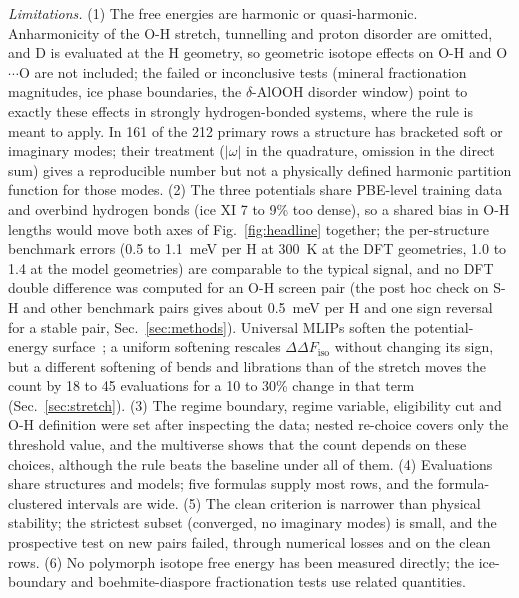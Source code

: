 \documentclass[aps,prmaterials,reprint,superscriptaddress,nofootinbib]{revtex4-2}
\newcommand{\ddF}{\Delta\Delta F_{\mathrm{iso}}}
\begin{document}
\textit{Limitations.} (1) The free energies are harmonic or quasi-harmonic. Anharmonicity of the O-H stretch, tunnelling and proton disorder are omitted, and D is evaluated at the H geometry, so geometric isotope effects on O-H and O$\cdots$O are not included; the failed or inconclusive tests (mineral fractionation magnitudes, ice phase boundaries, the $\delta$-AlOOH disorder window) point to exactly these effects in strongly hydrogen-bonded systems, where the rule is meant to apply. In 161 of the 212 primary rows a structure has bracketed soft or imaginary modes; their treatment ($|\omega|$ in the quadrature, omission in the direct sum) gives a reproducible number but not a physically defined harmonic partition function for those modes. (2) The three potentials share PBE-level training data and overbind hydrogen bonds (ice XI 7 to 9\% too dense), so a shared bias in O-H lengths would move both axes of Fig.~\ref{fig:headline} together; the per-structure benchmark errors (0.5 to 1.1~meV per H at 300~K at the DFT geometries, 1.0 to 1.4 at the model geometries) are comparable to the typical signal, and no DFT double difference was computed for an O-H screen pair (the post hoc check on S-H and other benchmark pairs gives about 0.5~meV per H and one sign reversal for a stable pair, Sec.~\ref{sec:methods}). Universal MLIPs soften the potential-energy surface~\cite{Deng2025}; a uniform softening rescales $\ddF$ without changing its sign, but a different softening of bends and librations than of the stretch moves the count by 18 to 45 evaluations for a 10 to 30\% change in that term (Sec.~\ref{sec:stretch}). (3) The regime boundary, regime variable, eligibility cut and O-H definition were set after inspecting the data; nested re-choice covers only the threshold value, and the multiverse shows that the count depends on these choices, although the rule beats the baseline under all of them. (4) Evaluations share structures and models; five formulas supply most rows, and the formula-clustered intervals are wide. (5) The clean criterion is narrower than physical stability; the strictest subset (converged, no imaginary modes) is small, and the prospective test on new pairs failed, through numerical losses and on the clean rows. (6) No polymorph isotope free energy has been measured directly; the ice-boundary and boehmite-diaspore fractionation tests use related quantities.
\end{document}
